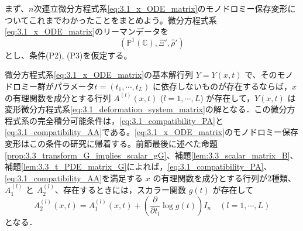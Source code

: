 
まず、$n$次連立微分方程式系\eqref{eq:3.1_x_ODE_matrix}のモノドロミー保存変形についてこれまでわかったことをまとめよう。微分方程式系\eqref{eq:3.1_x_ODE_matrix}のリーマンデータを
\[
  (\mathbb{P}^1(\mathbb{C}), \Xi', \hat{\rho}')
\]
とし、条件(P2), (P3)を仮定する。

微分方程式系\eqref{eq:3.1_x_ODE_matrix}の基本解行列 $Y=Y(x,t)$ で、そのモノドロミー群がパラメータ$t=(t_1, \cdots, t_L)$ に依存しないものが存在するならば，$x$ の有理関数を成分とする行列 $A^{(l)}(x,t)$ ($l=1,\cdots,L$) が存在して，$Y(x,t)$ は変形微分方程式系\eqref{eq:3.1_deformation_system_matrix}の解となる．この微分方程式系の完全積分可能条件は，\eqref{eq:3.1_compatibility_PA}と\eqref{eq:3.1_compatibility_AA}である。\eqref{eq:3.1_x_ODE_matrix}のモノドロミー保存変形はこの条件の研究に帰着する。前節最後に述べた命題\ref{prop:3.3_transform_G_implies_scalar_gG}、補題\ref{lem:3.3_scalar_matrix_B}、補題\ref{lem:3.3_t_PDE_matrix_G}によれば，\eqref{eq:3.1_compatibility_PA}、\eqref{eq:3.1_compatibility_AA}を満足する $x$ の有理関数を成分とする行列が2種類、$A_1^{(l)}$ と $A_2^{(l)}$、存在するときには，スカラー関数 $g(t)$ が存在して
\[
  A_2^{(l)}(x,t) = A_1^{(l)}(x,t) + \left( \frac{\partial}{\partial t_l} \log g(t) \right) I_n \quad (l=1,\cdots,L)
\]
となる．

